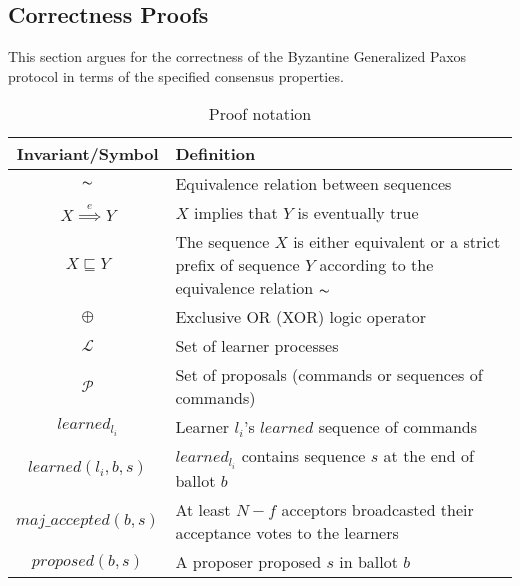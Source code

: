 \subsection{Correctness Proofs}

This section argues for the correctness of the Byzantine Generalized Paxos protocol in terms of the specified consensus properties.\par


\begin{table}[h!]
	\renewcommand{\arraystretch}{1.5}
	\centering
	\begin{tabularx}{\linewidth}{ |c|X|}
		\hline
		Invariant/Symbol & Definition \\
		\hline
		$\thicksim$ & Equivalence relation between sequences \\
		\hline
		$X \overset{e}{\implies} Y$ & $X$ implies that $Y$ is eventually true \\
		\hline
		$X \sqsubseteq Y$ & The sequence $X$ is either equivalent or a strict prefix of sequence $Y$ according to the equivalence relation $\thicksim$ \\
		\hline
		$\oplus$ & Exclusive OR (XOR) logic operator \\
		\hline
		$\mathcal{L}$ & Set of learner processes \\
		\hline
		$\mathcal{P}$ & Set of proposals (commands or sequences of commands) \\
		\hline
		$learned_{l_i}$ & Learner $l_i$'s $learned$ sequence of commands \\
		\hline
		$learned(l_i,b,s)$ & $learned_{l_i}$ contains sequence $s$ at the end of ballot $b$  \\
		\hline
		$maj\_accepted(b,s)$ & At least $N-f$ acceptors broadcasted their acceptance votes to the learners\\
		\hline
		$proposed(b,s)$ & A proposer proposed $s$ in ballot $b$ \\
		\hline
		
  	\end{tabularx} 
	\caption{Proof notation} 
	\label{table:1}
\end{table}

